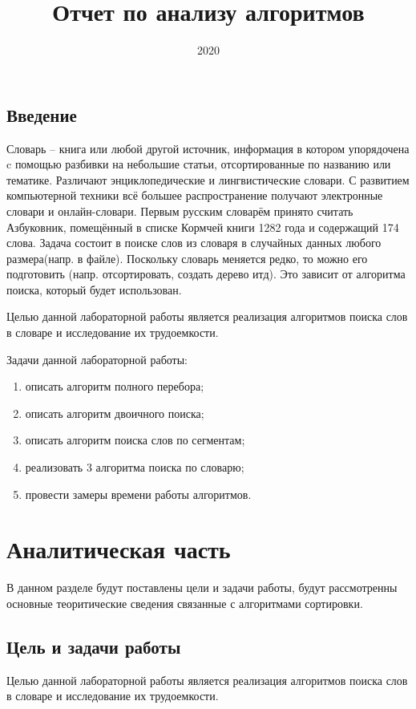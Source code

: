 \documentclass{article}
\title{Отчет по анализу алгоритмов}
\date{2020}
\begin{document}
	
	\newpage
	\tableofcontents
	\newpage
	\begin{center}
	    \section*{Введение}
	\end{center}
    		Словарь -- книга или любой другой источник,
    информация в котором упорядочена c помощью разбивки на небольшие статьи,
    отсортированные по названию или тематике. 
    Различают энциклопедические и лингвистические словари.
    С развитием компьютерной техники всё большее распространение получают электронные словари и онлайн-словари.
    Первым русским словарём принято считать Азбуковник,
    помещённый в списке Кормчей книги 1282 года и содержащий 174 слова.
    Задача состоит в поиске слов из словаря в случайных данных любого размера(напр. в файле).
    Поскольку словарь меняется редко, то можно его подготовить
    (напр. отсортировать, создать дерево итд). 
    Это зависит от алгоритма поиска, который будет использован. 

    Целью данной лабораторной работы является реализация 
    алгоритмов поиска слов в словаре и исследование их трудоемкости.


    Задачи данной лабораторной работы:
    \begin{enumerate}
        \item описать алгоритм полного перебора;
        \item описать алгоритм двоичного поиска;
        \item описать алгоритм поиска слов по сегментам;
        \item реализовать 3 алгоритма поиска по словарю;
        \item провести замеры времени работы алгоритмов.
    \end{enumerate}
	\newpage
	\section{Аналитическая часть}
	В данном разделе будут поставлены цели и задачи работы, будут рассмотренны основные теоритические сведения связанные с алгоритмами сортировки.
		\subsection{Цель и задачи работы}
    Целью данной лабораторной работы является реализация 
    алгоритмов поиска слов в словаре и исследование их трудоемкости.
\end{document}
